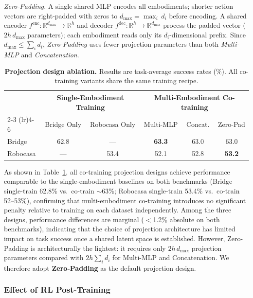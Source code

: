 \documentclass{article}
\begin{document}
\textit{Zero-Padding.}
A single shared MLP encodes all embodiments; shorter action vectors are right-padded with zeros to
$d_{\max} = \max_i\, d_i$ before encoding.  A shared encoder
$f^{\mathrm{enc}}\!: \mathbb{R}^{d_{\max}}\!\to\!\mathbb{R}^{h}$ and
decoder $f^{\mathrm{dec}}\!: \mathbb{R}^{h}\!\to\!\mathbb{R}^{d_{\max}}$
process the padded vector (\textbf{$2h\,d_{\max}$} parameters); each embodiment
reads only its $d_i$-dimensional prefix.  Since
$d_{\max} \leq \sum_i d_i$, \textit{Zero-Padding} uses fewer projection
parameters than both \textit{Multi-MLP} and \textit{Concatenation}.

\begin{table}[htbp]
\centering
\caption{\textbf{Projection design ablation.} Results are task-average success
  rates (\%). All co-training variants share the same training recipe.}
\label{tab:projection_head}
\small
\begin{tabular}{l cc ccc}
\toprule
& \multicolumn{2}{c}{Single-Embodiment Training} & \multicolumn{3}{c}{Multi-Embodiment Co-training} \\
\cmidrule(lr){2-3} \cmidrule(lr){4-6}
& Bridge Only & Robocasa Only & Multi-MLP & Concat. & Zero-Pad \\
\midrule
Bridge   & 62.8 & ---  & \textbf{63.3} & 63.0 & 63.0 \\
Robocasa & ---  & 53.4 & 52.1 & 52.8 & \textbf{53.2} \\
\bottomrule
\end{tabular}
\end{table}

As shown in Table~\ref{tab:projection_head}, all co-training
projection designs achieve performance comparable to the
single-embodiment baselines on both benchmarks (Bridge single-train
62.8\% vs.\ co-train $\sim$63\%; Robocasa single-train 53.4\% vs.\
co-train 52--53\%), confirming that multi-embodiment co-training
introduces no significant penalty relative to training on each dataset
independently.
Among the three designs, performance differences are marginal
($<$1.2\% absolute on both benchmarks), indicating that the choice of
projection architecture has limited impact on task success once a shared
latent space is established.
However, Zero-Padding is architecturally the lightest: it requires only
$2h\,d_{\max}$ projection parameters compared with $2h\sum_i d_i$ for
Multi-MLP and Concatenation.
We therefore adopt \textbf{Zero-Padding} as the default projection
design.



\subsubsection{Effect of RL Post-Training}
\label{sec:ablation_rl}
\end{document}
